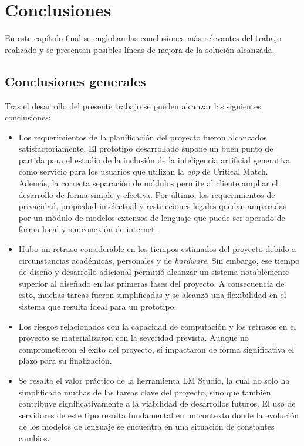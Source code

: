 
\chapter{Conclusiones} %
En este capítulo final se engloban las conclusiones más relevantes del trabajo realizado
y se presentan posibles líneas de mejora de la solución alcanzada.


\section{Conclusiones generales}

Tras el desarrollo del presente trabajo se pueden alcanzar las siguientes conclusiones:

\begin{itemize}
\item Los requerimientos de la planificación del proyecto fueron alcanzados
      satisfactoriamente.
      El prototipo desarrollado supone un buen punto de partida para el estudio de
      la inclusión de la inteligencia artificial generativa como servicio para
      los usuarios que utilizan la \textit{app} de Critical Match.
      Además, la correcta separación de módulos permite al cliente ampliar el desarrollo
      de forma simple y efectiva.
      Por último, los requerimientos de privacidad, propiedad intelectual y restricciones legales
      quedan amparadas por un módulo de modelos extensos de lenguaje que puede ser operado
      de forma local y sin conexión de internet.     
\item Hubo un retraso considerable en los tiempos estimados del proyecto debido a
      circunstancias académicas, personales y de \textit{hardware}.
      Sin embargo, ese tiempo de diseño y desarrollo adicional permitió alcanzar un sistema
      notablemente superior al diseñado en las primeras fases del proyecto. 
      A consecuencia de esto, muchas tareas fueron simplificadas y se alcanzó una flexibilidad
      en el sistema que resulta ideal para un prototipo.
\item Los riesgos relacionados con la capacidad de computación y los retrasos en el proyecto
      se materializaron con la severidad prevista.
      Aunque no comprometieron el éxito del proyecto,
      sí impactaron de forma significativa el plazo para su finalización.
\item Se resalta el valor práctico de la herramienta LM Studio,
      la cual no solo ha simplificado muchas de las tareas clave del proyecto,
      sino que también contribuye significativamente a la viabilidad de desarrollos futuros.
      El uso de servidores de este tipo resulta fundamental en un contexto donde
      la evolución de los modelos de lenguaje se encuentra en una situación de constantes cambios.
\end{itemize}
